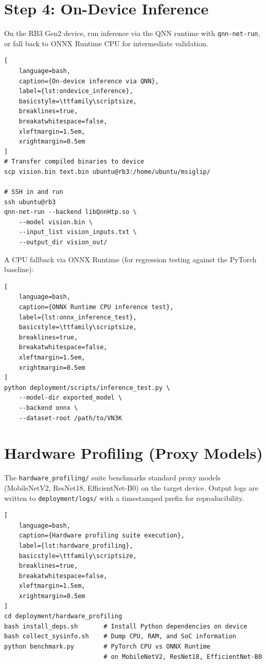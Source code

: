 \documentclass[../main.tex]{subfiles}
\begin{document}
\section{Step 4: On-Device Inference}

\noindent On the RB3 Gen2 device, run inference via the QNN runtime with \texttt{qnn-net-run}, or fall back to ONNX Runtime CPU for intermediate validation.

\begin{lstlisting}[
    language=bash,
    caption={On-device inference via QNN},
    label={lst:ondevice_inference},
    basicstyle=\ttfamily\scriptsize,
    breaklines=true,
    breakatwhitespace=false,
    xleftmargin=1.5em,
    xrightmargin=0.5em
]
# Transfer compiled binaries to device
scp vision.bin text.bin ubuntu@rb3:/home/ubuntu/msiglip/

# SSH in and run
ssh ubuntu@rb3
qnn-net-run --backend libQnnHtp.so \
    --model vision.bin \
    --input_list vision_inputs.txt \
    --output_dir vision_out/
\end{lstlisting}

\noindent A CPU fallback via ONNX Runtime (for regression testing against the PyTorch baseline):

\begin{lstlisting}[
    language=bash,
    caption={ONNX Runtime CPU inference test},
    label={lst:onnx_inference_test},
    basicstyle=\ttfamily\scriptsize,
    breaklines=true,
    breakatwhitespace=false,
    xleftmargin=1.5em,
    xrightmargin=0.5em
]
python deployment/scripts/inference_test.py \
    --model-dir exported_model \
    --backend onnx \
    --dataset-root /path/to/VN3K
\end{lstlisting}

\section{Hardware Profiling (Proxy Models)}

\noindent The \texttt{hardware\_profiling/} suite benchmarks standard proxy models (MobileNetV2, ResNet18, EfficientNet-B0) on the target device. Output logs are written to \texttt{deployment/logs/} with a timestamped prefix for reproducibility.

\begin{lstlisting}[
    language=bash,
    caption={Hardware profiling suite execution},
    label={lst:hardware_profiling},
    basicstyle=\ttfamily\scriptsize,
    breaklines=true,
    breakatwhitespace=false,
    xleftmargin=1.5em,
    xrightmargin=0.5em
]
cd deployment/hardware_profiling
bash install_deps.sh       # Install Python dependencies on device
bash collect_sysinfo.sh    # Dump CPU, RAM, and SoC information
python benchmark.py        # PyTorch CPU vs ONNX Runtime
                           # on MobileNetV2, ResNet18, EfficientNet-B0
\end{lstlisting}
\end{document}
